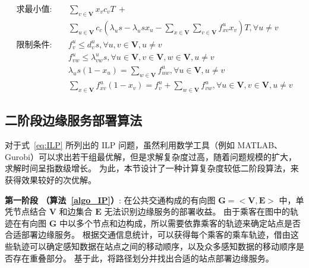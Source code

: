 \begin{equation}
\begin{aligned}
求最小值: &\quad \sum_{v\in \boldsymbol{V}}x_v c_vT \ + \\&\quad \sum_{u\in \boldsymbol{V}}c_c(\lambda_u s -  \lambda_u s x_u - \sum_{x\in \boldsymbol{V}}\sum_{v\in \boldsymbol{V}}f^u_{xv} x_v )T, \forall u \neq v\\
\text{限制条件:} &\quad  f^u_v \leq d^u_v s, \forall u, v\in \boldsymbol{V}, u\neq v\\
&\quad f^u_{vw} \leq \lambda^u_{vw} s, \forall u \in \boldsymbol{V}, v \in \boldsymbol{V}, w \in \boldsymbol{V}, u \neq v\\
&\quad \lambda_u s (1 - x_u) = \sum_{w\in \boldsymbol{V}}f^u_{uw}, \forall u\in \boldsymbol{V}, u \neq v\\
&\quad \sum_{x\in \boldsymbol{V}}f^u_{xv} (1-x_v) = f^u_v + \sum_{w\in \boldsymbol{V}}f^u_{vw}, \forall u\in \boldsymbol{V}, v\in \boldsymbol{V},u \neq v
\end{aligned}
\label{eq:ILP}
\end{equation}

\subsection{二阶段边缘服务部署算法}

对于式~\eqref{eq:ILP} 所列出的 ILP 问题，虽然利用数学工具（例如 MATLAB、Gurobi）可以求出若干组最优解，但是求解复杂度过高，随着问题规模的扩大，求解时间呈指数级增长。
为此，本节设计了一种计算复杂度较低二阶段算法，来获得效果较好的次优解。

\textbf{第一阶段 （算法~\ref{algo_IP}）}:
在公共交通构成的有向图 $\boldsymbol{G}=<\boldsymbol{V}, \boldsymbol{E}>$ 中，单凭节点结合 $\boldsymbol{V}$ 和边集合 $\boldsymbol{E}$ 无法识别边缘服务的部署收益。
由于乘客在图中的轨迹在有向图 $\boldsymbol{G}$ 中以多个节点和边构成，所以需要依靠乘客的轨迹来确定站点是否合适部署边缘服务。
根据交通信息统计，可以获得每个乘客的乘车轨迹，借由这些轨迹可以确定感知数据在站点之间的移动顺序，以及众多感知数据的移动顺序是否存在重叠部分。
基于此，将路径划分并找出合适的站点部署边缘服务。

